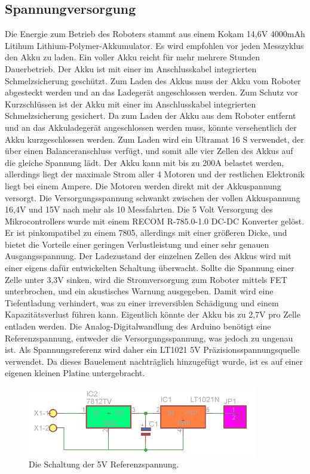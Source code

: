 \documentclass[a4paper,bibtotoc,oneside]{scrbook}
\begin{document}
\subsection{Spannungversorgung}\thispagestyle{empty}
Die Energie zum Betrieb des Roboters stammt aus einem Kokam 14,6V 4000mAh Litihum Lithium-Polymer-Akkumulator. Es wird empfohlen vor jeden Messzyklus den Akku zu laden. Ein voller Akku reicht für mehr mehrere Stunden Dauerbetrieb. Der Akku ist mit einer im Anschlusskabel integrierten Schmelzsicherung geschützt. Zum Laden des Akkus muss der Akku vom Roboter abgesteckt werden und an das Ladegerät angeschlossen werden. Zum Schutz vor Kurzschlüssen ist der Akku mit einer im Anschlusskabel integrierten Schmelzsicherung gesichert. Da zum Laden der Akku aus dem Roboter entfernt und an das Akkuladegerät angeschlossen werden muss, könnte versehentlich der Akku kurzgeschlossen werden. Zum Laden wird ein Ultramat 16 S verwendet, der über einen Balanceranschluss verfügt, und somit alle vier Zellen des Akkus auf die gleiche Spannung lädt. 
Der Akku kann mit bis zu 200A belastet werden, allerdings liegt der maximale Strom aller 4 Motoren und der restlichen Elektronik liegt bei einem Ampere. Die Motoren werden direkt mit der Akkuspannung versorgt. Die Versorgungsspannung schwankt zwischen der vollen Akkuspannung 16,4V und 15V nach mehr als 10 Messfahrten.
Die 5 Volt Versorgung des Mikrocontrollers wurde mit einem RECOM R-785.0-1.0 DC-DC Konverter gelöst. Er ist pinkompatibel zu einem 7805, allerdings mit einer größeren Dicke, und bietet die Vorteile einer geringen Verlustleistung und einer sehr genauen Ausgangsspannung. 
Der Ladezustand der einzelnen Zellen des Akkus wird mit einer eigens dafür entwickelten Schaltung überwacht. Sollte die Spannung einer Zelle unter 3,3V sinken, wird die Stromversorgung zum Roboter mittels FET unterbrochen, und ein akustisches Warnung ausgegeben. Damit wird eine Tiefentladung verhindert, was zu einer irreversiblen Schädigung und einem Kapazitätsverlust führen kann. Eigentlich könnte der Akku bis zu 2,7V pro Zelle entladen werden.
Die Analog-Digitalwandlung des Arduino benötigt eine Referenzspannung, entweder die Versorgungsspannung, was jedoch zu ungenau ist. Als Spannungsreferenz wird daher ein LT1021 5V Präzisionsspannungsquelle verwendet. Da dieses Bauelement nachträglich hinzugefügt wurde, ist es auf einer eigenen kleinen Platine untergebracht.

\begin{figure}[htbp]
\centering
\includegraphics[width=100mm]{img/refu.png}
\caption{Die Schaltung der 5V Referenzspannung.}\label{refu}
\end{figure}
\end{document}
